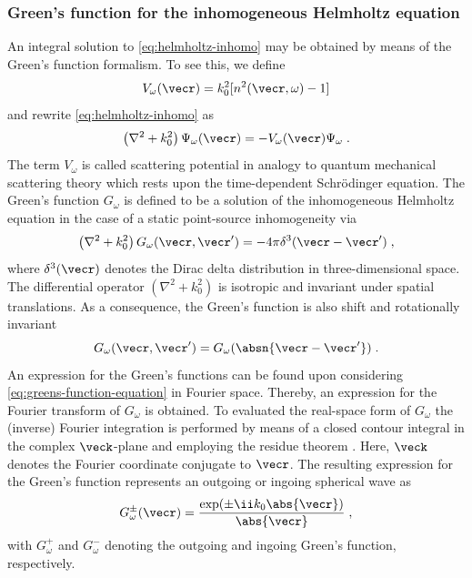 \documentclass[
twoside,
openright,
titlepage,
numbers=noenddot,
headinclude,
fleqn,
a4paper,
footinclude=true,
cleardoublepage=empty,
abstractoff,
BCOR=5mm,
paper=a4,
fontsize=11pt,
british,ngerman,american,
]{scrreprt}
\begin{document}
\subsubsection{Green's function for the inhomogeneous Helmholtz
  equation}
\label{sec:greens-function-inhomogeneous-helmholtz}

An integral solution to \cref{eq:helmholtz-inhomo} may be obtained by
means of the Green's function formalism.  To see this, we define
\begin{equation}
  \label{eq:scattering-potential}
  V_\omega(\vecr)=k_0^2[n^2(\vecr,\omega)-1]
\end{equation}
and rewrite \cref{eq:helmholtz-inhomo} as
\begin{equation}
    \label{eq:helmholtz-scattering}
    \left(\nabla^2 + k_0^2\right)\Psi_{\omega}(\vecr)
    =-V_\omega(\vecr)\Psi_{\omega} \;.
\end{equation}
The term $V_\omega$ is called scattering potential in analogy to
quantum mechanical scattering theory which rests upon the
time-dependent Schrödinger equation.  The Green's function
$G_{\omega}$ is defined to be a solution of the inhomogeneous
Helmholtz equation in the case of a static point-source inhomogeneity
via
\begin{equation}
  \label{eq:greens-function-equation}
    \left(\nabla^2 + k_0^2\right)G_{\omega}(\vecr,\vecr') = 
    -4\pi\delta^3(\vecr-\vecr')\;,
\end{equation}
where $\delta^3(\vecr)$ denotes the Dirac delta distribution in
three-dimensional space.  The differential operator $\left(\nabla^2 +
  k_0^2\right)$ is isotropic and invariant under spatial translations.
As a consequence, the Green's function is also shift and rotationally
invariant
\begin{equation}
  G_\omega(\vecr,\vecr')=G_\omega(\absn{\vecr-\vecr'}) \;.
\end{equation}
An expression for the Green's functions can be found upon considering
\cref{eq:greens-function-equation} in Fourier space.  Thereby, an
expression for the Fourier transform of $G_\omega$ is obtained.  To
evaluated the real-space form of $G_\omega$ the (inverse) Fourier
integration is performed by means of a closed contour integral in the
complex $\veck$-plane and employing the residue theorem
\cite{PaganinBook}.  Here, $\veck$ denotes the Fourier coordinate
conjugate to $\vecr$.  The resulting expression for the Green's
function represents an outgoing or ingoing spherical wave as
\begin{equation}
  \label{eq:green-funct-solution}
  G_{\omega}^{\pm}(\vecr) = 
  \frac{\exp(\pm\ii k_0\abs{\vecr})}{\abs{\vecr}} \;,
\end{equation}
with $G_{\omega}^{+}$ and $G_{\omega}^{-}$ denoting the outgoing and
ingoing Green's function, respectively.
\end{document}
